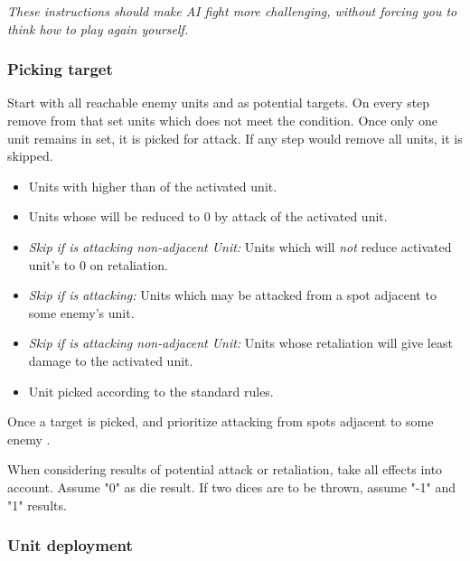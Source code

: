 \begin{multicols*}{2}
    \textit{These instructions should make AI fight more challenging, without forcing you to think how to play again yourself.}
    
    \subsubsection*{Picking target}
    
    Start with all reachable enemy units and as potential targets. On every step remove from that set units which does not meet the condition. Once only one unit remains in set, it is picked for attack. If any step would remove all units, it is skipped.
    
    
    \begin{itemize}
        \item Units with  higher than  of the activated unit.
        \item Units whose  will be reduced to $0$ by attack of the activated unit.
        \item \textit{Skip if  is attacking non-adjacent Unit:} Units which will \emph{not} reduce activated unit's  to $0$ on retaliation.
        \item \textit{Skip if  is attacking:} Units which may be attacked from a spot adjacent to some enemy's  unit.
        \item \textit{Skip if  is attacking non-adjacent Unit:} Units whose retaliation will give least damage to the activated unit.
        \item Unit picked according to the standard rules.
    \end{itemize}
    
    Once a target is picked,  and  prioritize attacking from spots adjacent to some enemy .
   
    When considering results of potential attack or retaliation, take all effects into account.  Assume "0" as die result. If two dices are to be thrown, assume "-1" and "1" results.
    
    \subsubsection*{Unit deployment}
    

\end{multicols*}
